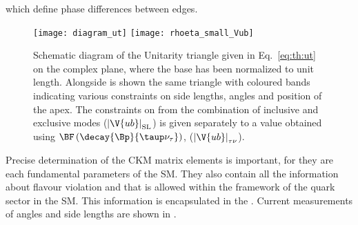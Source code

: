 which define phase differences between edges.

\begin{figure}
  \begin{center}
      \texttt{[image: diagram\_ut]}
      \texttt{[image: rhoeta\_small\_Vub]}
  \end{center}
  \caption[Unitarity triangle and current constraints]{\small
    Schematic diagram of the Unitarity triangle given in Eq.~\ref{eq:th:ut} on the complex plane,
    where the base has been normalized to unit length.
    Alongside is shown the same triangle with coloured bands indicating various constraints on
    side lengths, angles and position of the apex.
    The constraints on  from the combination of inclusive and exclusive modes
    ($\left|\V{ub}\right|_\mathrm{SL}$) is given separately to a value obtained using
    $\BF\left(\decay{\Bp}{\taup\nu_\tau}\right)$, ($\left|\V{ub}\right|_{\tau\nu}$).
  }
  \label{fig:th:ut}
\end{figure}

Precise determination of the CKM matrix elements is important, for  they are each fundamental
parameters of the SM.
They also contain all the information about flavour violation and \CPV that is allowed within the
framework of the quark sector in the SM.
This information is encapsulated in the \ut.
Current measurements of angles and side lengths are shown in .




